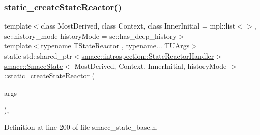 \subsubsection{\texorpdfstring{static\+\_\+create\+State\+Reactor()}{static\_createStateReactor()}}
{\footnotesize\ttfamily template$<$class Most\+Derived, class Context, class Inner\+Initial = mpl\+::list$<$$>$, sc\+::history\+\_\+mode history\+Mode = sc\+::has\+\_\+deep\+\_\+history$>$ \\
template$<$typename T\+State\+Reactor , typename... T\+U\+Args$>$ \\
static std\+::shared\+\_\+ptr$<$\hyperlink{classsmacc_1_1introspection_1_1StateReactorHandler}{smacc\+::introspection\+::\+State\+Reactor\+Handler}$>$ \hyperlink{classsmacc_1_1SmaccState}{smacc\+::\+Smacc\+State}$<$ Most\+Derived, Context, Inner\+Initial, history\+Mode $>$\+::static\+\_\+create\+State\+Reactor (\begin{DoxyParamCaption}\item[{T\+U\+Args...}]{args }\end{DoxyParamCaption})\hspace{0.3cm}{\ttfamily [inline]}, {\ttfamily [static]}}



Definition at line 200 of file smacc\+\_\+state\+\_\+base.\+h.


